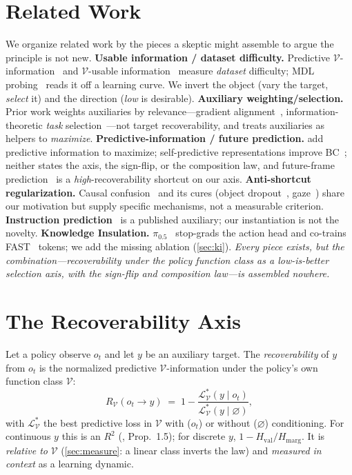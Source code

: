 \documentclass{article}
\newcommand{\V}{\mathcal{V}}
\newcommand{\recov}{R_{\V}}
\begin{document}
\section{Related Work}\label{sec:related}
We organize related work by the pieces a skeptic might assemble to argue the principle is not new.
\textbf{Usable information / dataset difficulty.} Predictive $\V$-information~\citep{xu2020} and $\V$-usable
information~\citep{ethayarajh2022} measure \emph{dataset} difficulty; MDL probing~\citep{voita2020} reads it off a
learning curve. We invert the object (vary the target, \emph{select} it) and the direction (\emph{low} is
desirable). \textbf{Auxiliary weighting/selection.} Prior work weights auxiliaries by relevance---gradient
alignment~\citep{lin2019}, information-theoretic \emph{task} selection~\citep{itts}---not target recoverability, and
treats auxiliaries as helpers to \emph{maximize}. \textbf{Predictive-information / future prediction.}
\citet{piqtopt} add predictive information to maximize; self-predictive representations improve
BC~\citep{byolgamma}; neither states the axis, the sign-flip, or the composition law, and future-frame
prediction~\citep{gr1,vpp} is a \emph{high}-recoverability shortcut on our axis. \textbf{Anti-shortcut
regularization.} Causal confusion~\citep{dehaan2019} and its cures (object dropout~\citep{oreo},
gaze~\citep{gabril}) share our motivation but supply specific mechanisms, not a measurable criterion.
\textbf{Instruction prediction}~\citep{hejna2023} is a published auxiliary; our instantiation is not the novelty.
\textbf{Knowledge Insulation.} $\pi_{0.5}$~\citep{pi05,pi05ki} stop-grads the action head and co-trains
FAST~\citep{fast} tokens; we add the missing ablation (\cref{sec:ki}). \emph{Every piece exists, but the
combination---recoverability under the policy function class as a low-is-better selection axis, with the sign-flip
and composition law---is assembled nowhere.}

\section{The Recoverability Axis}\label{sec:framework}
Let a policy observe $o_t$ and let $y$ be an auxiliary target. The \emph{recoverability} of $y$ from $o_t$ is the
normalized predictive $\V$-information under the policy's own function class $\V$:
\begin{equation}
\recov(o_t \to y) \;=\; 1 - \frac{\mathcal{L}^{*}_{\V}(y \mid o_t)}{\mathcal{L}^{*}_{\V}(y \mid \varnothing)},
\label{eq:recov}
\end{equation}
with $\mathcal{L}^{*}_{\V}$ the best predictive loss in $\V$ with ($o_t$) or without ($\varnothing$) conditioning.
For continuous $y$ this is an $R^2$ (\citealp{xu2020}, Prop.~1.5); for discrete $y$, $1-H_{\mathrm{val}}/
H_{\mathrm{marg}}$. It is \emph{relative to} $\V$ (\cref{sec:measure}: a linear class inverts the law) and
\emph{measured in context} as a learning dynamic.
\end{document}
